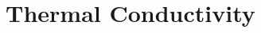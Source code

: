 \documentclass[aps,prb,onecolumn,preprint,superscriptaddress,footinbib,amsmath,amssymb,floatfix]{revtex4}
\begin{document}




\section{\label{S:Conductivity}Thermal Conductivity}
\end{document}
